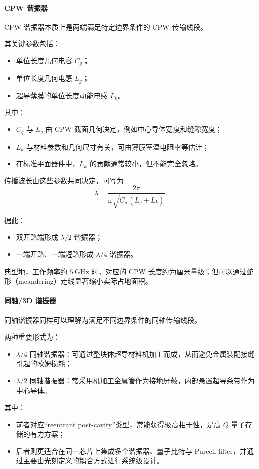 \documentclass[12pt,a4paper,oneside]{ctexbook}
\begin{document}
\paragraph{CPW 谐振器}
CPW 谐振器本质上是两端满足特定边界条件的 CPW 传输线段。

其关键参数包括：
\begin{itemize}
    \item 单位长度几何电容 \(C_g\)；
    \item 单位长度几何电感 \(L_g\)；
    \item 超导薄膜的单位长度动能电感 \(L_k\)。
\end{itemize}

其中：
\begin{itemize}
    \item \(C_g\) 与 \(L_g\) 由 CPW 截面几何决定，例如中心导体宽度和缝隙宽度；
    \item \(L_k\) 与材料参数和几何尺寸有关，可由薄膜室温电阻率等估计；
    \item 在标准平面器件中，\(L_k\) 的贡献通常较小，但不能完全忽略。
\end{itemize}

传播波长由这些参数共同决定，可写为
\[
\lambda = \frac{2\pi}{\omega\sqrt{C_g\,(L_g+L_k)}}.
\]

据此：
\begin{itemize}
    \item 双开路端形成 \(\lambda/2\) 谐振器；
    \item 一端开路、一端短路形成 \(\lambda/4\) 谐振器。
\end{itemize}

典型地，工作频率约 \(5~\mathrm{GHz}\) 时，对应的 CPW 长度约为厘米量级；但可以通过蛇形（meandering）走线显著缩小实际占地面积。

\paragraph{同轴/3D 谐振器}
同轴谐振器同样可以理解为满足不同边界条件的同轴传输线段。

两种重要形式为：
\begin{itemize}
    \item \(\lambda/4\) 同轴谐振器：可通过整块体超导材料机加工而成，从而避免金属装配接缝引起的欧姆损耗；
    \item \(\lambda/2\) 同轴谐振器：常采用机加工金属管作为接地屏蔽，内部悬置超导条带作为中心导体。
\end{itemize}

其中：
\begin{itemize}
    \item 前者对应“reentrant post-cavity”类型，常能获得极高相干性，是高 \(Q\) 量子存储的有力方案；
    \item 后者则更适合在同一芯片上集成多个谐振器、量子比特与 Purcell filter，并通过主要由光刻定义的耦合方式进行系统级设计。
\end{itemize}
\end{document}
